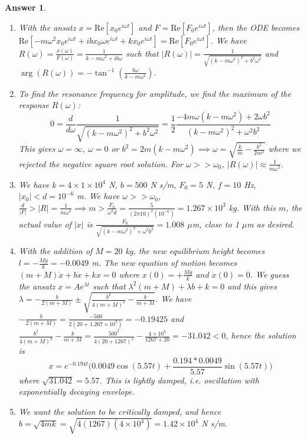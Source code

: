 \documentclass[a4paper]{article}
\newtheorem{ans}{Answer}[subsection]
\theoremstyle{new}
\begin{document}
\begin{ans}\leavevmode
\begin{enumerate}[label=(\roman*)]
\item With the ansatz $x=\text{Re}[x_0e^{i\omega t}]$ and $F=\text{Re}[F_0e^{i\omega t}]$, then the ODE becomes $\text{Re}[-m\omega^2x_0e^{i\omega t}+ibx_0\omega e^{i\omega t}+kx_0e^{i\omega t}]=\text{Re}[F_0e^{i\omega t}]$. We have $R(\omega)=\frac{x(\omega)}{F(\omega)}=\frac{1}{k-m\omega^2+ib\omega}$ such that $|R(\omega)|=\frac{1}{\sqrt{(k-m\omega^2)^2+b^2\omega^2}}$ and $\arg(R(\omega))=-\tan^{-1}(\frac{b\omega}{k-m\omega^2})$.
\item To find the resonance frequency for amplitude, we find the maximum of the response $R(\omega)$:
$$0=\frac{d}{d\omega}\frac{1}{\sqrt{(k-m\omega^2)^2+b^2\omega^2}}=\frac{1}{2}\frac{-4m\omega(k-m\omega^2)+2\omega b^2}{(k-m\omega^2)^2+\omega^2b^2}$$
This gives $\omega=\infty$, $\omega=0$ or $b^2=2m(k-m\omega^2)\implies\omega=\sqrt{\frac{k}{m}-\frac{b^2}{2m^2}}$ where we rejected the negative square root solution. For $\omega>>\omega_0$, $|R(\omega)|\approx\frac{1}{m\omega^2}$.
\item We have $k=4\times1\times10^4$ N, $b=500$ N s/m, $F_0=5$ N, $f=10$ Hz, $|x_0|<d=10^{-6}$ m. We have $\omega>>\omega_0$, $\frac{d}{|F|}>|R|=\frac{1}{m\omega^2}\implies m>\frac{F_0}{\omega^2d}=\frac{5}{(2\pi 10)^2(10^{-6})}=1.267\times10^3$ kg. With this $m$, the actual value of $|x|$ is $\frac{F_0}{\sqrt{(k-m\omega^2)^2+\omega^2b^2}}=1.008$ $\mu$m, close to 1 $\mu$m as desired.
\item With the addition of $M=20$ kg, the new equilibrium height becomes $l=-\frac{Mg}{k}=-0.0049$ m. The new equation of motion becomes $(m+M)\ddot{x}+b\dot{x}+kx=0$ where $x(0)=+\frac{Mg}{k}$ and $\dot{x}(0)=0$. We guess the ansatz $x=Ae^{\lambda t}$ such that $\lambda^2(m+M)+\lambda b+k=0$ and this gives $\lambda=-\frac{b}{2(m+M)}\pm\sqrt{\frac{b^2}{4(m+M)^2}-\frac{k}{m+M}}$. We have $-\frac{b}{2(m+M)}=\frac{-500}{2(20+1.267\times10^3)}=-0.19425$ and $\frac{b^2}{4(m+M)^2}-\frac{k}{m+M}=\frac{500^2}{4(20+1267)^2}-\frac{4\times10^4}{1267+20}=-31.042<0$, hence the solution is 
$$x=e^{-0.194t}\bigg(0.0049\cos(5.57t)+\frac{0.194*0.0049}{5.57}\sin(5.57t)\bigg)$$
where $\sqrt{31.042}=5.57$. This is lightly damped, i.e. oscillation with exponentially decaying envelope.
\begin{center}
\end{center}
\item We want the solution to be critically damped, and hence $b=\sqrt{4mk}=\sqrt{4(1267)(4\times10^4)}=1.42\times10^4$ N s/m.
\end{enumerate}
\end{ans}
\end{document}
